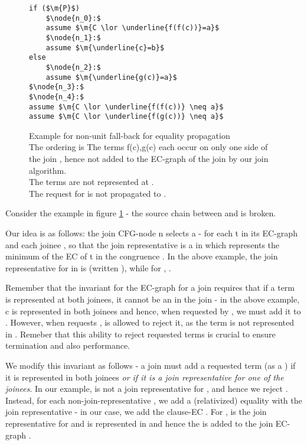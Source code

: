 \begin{figure}
\begin{lstlisting}
if ($\m{P}$)
	$\node{n_0}:$
	assume $\m{C \lor \underline{f(f(c))}=a}$
	$\node{n_1}:$
	assume $\m{\underline{c}=b}$
else
	$\node{n_2}:$
	assume $\m{\underline{g(c)}=a}$
$\node{n_3}:$
$\node{n_4}:$
assume $\m{C \lor \underline{f(f(c))} \neq a}$
assume $\m{C \lor \underline{f(g(c))} \neq a}$
\end{lstlisting}
\caption{Example for non-unit fall-back for equality propagation\\
The ordering is 
The terms f(c),g(c) each occur on only one side of the join , 
hence not added to the EC-graph of the join by our join algorithm.\\
The terms  are not represented at .\\
The request for  is not propagated to .
}
\label{snippet_A.3.1}
\end{figure}

Consider the example in figure \ref{snippet_A.3.1} - the source chain between  and  is broken.

Our idea is as follows: the join CFG-node n selects a  -  for each \GT{} t in its EC-graph and each joinee , so that the join representative is a \GT{} in  which represents the minimum of the EC of t in the congruence . In the above example, the join representative for  in  is  (written ), while for , .

Remember that the invariant for the EC-graph for a join requires that if a term is represented at both joinees, it cannot be an \RGFA{} in the join - in the above example, c is represented in both joinees and hence, when requested by , we must add it to .
However, when  requests ,  is allowed to reject it, as the term  is not represented in .
Remeber that this ability to reject requested terms is crucial to ensure termination and also performance.

We modify this invariant as follows - a join must add a requested term (as a \GT{}) if it is represented in both joinees \emph{or if it is a join representative for one of the joinees}. In our example,  is not a join representative for , and hence we reject . Instead, for each non-join-representative \GT{}, we add a (relativized) equality with the join representative - in our case, 
we add the clause-EC . For ,  is the join representative for  and  is represented in  and hence the \GT{}  is added to the join EC-graph .


